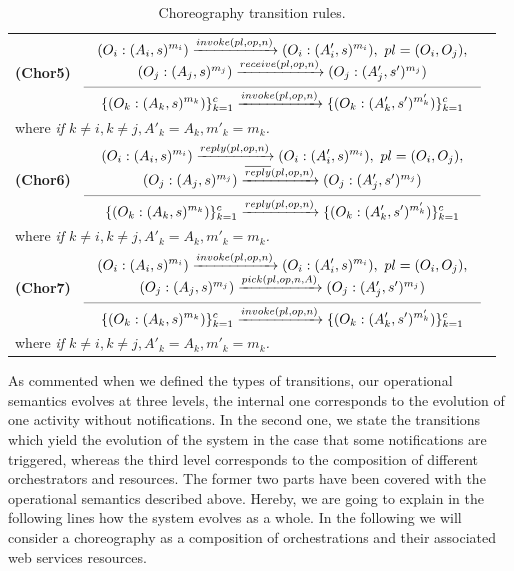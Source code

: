 \begin{table}[!ht]
{{\begin{tabular}{l}

\\[0.7cm]

\hspace{0.6cm}\textbf{(Chor5)}
$\reglaa{ %
(O_i:(A_i,s)^{m_i}) \xrightarrow{invoke(pl,op,n)} (O_i:(A'_i,s)^{m_i}),\ pl=(O_i,O_j),\\
(O_j:(A_j,s)^{m_j}) \xrightarrow{receive(pl,op,n)} (O_j:(A'_j,s')^{m_j})
}
{ %
\{(O_k:(A_k,s)^{m_k})\}_{k=1}^c
\xrightarrow{invoke(pl,op,n)}
\{(O_k:(A'_k,s')^{m'_k})\}_{k=1}^c
}{10}$
\\[0.7cm]
\hspace{2.cm}where  \it{if} $k\neq i,k\neq j, A'_k=A_k,m'_k=m_k$.

\\[0.2cm]

\hspace{0.6cm}\textbf{(Chor6)}
$\reglaa{ %
(O_i:(A_i,s)^{m_i}) \xrightarrow{reply(pl,op,n)} (O_i:(A'_i,s)^{m_i}),\ pl=(O_i,O_j),\\
(O_j:(A_j,s)^{m_j}) \xrightarrow{\overline{reply}(pl,op,n)} (O_j:(A'_j,s')^{m_j})
}
{ %
\{(O_k:(A_k,s)^{m_k})\}_{k=1}^c
\xrightarrow{reply(pl,op,n)}
\{(O_k:(A'_k,s')^{m'_k})\}_{k=1}^c
}{10}$\\[0.7cm]
\hspace{2.cm}where  \it{if} $k\neq i,k\neq j, A'_k=A_k,m'_k=m_k$.

\\[0.2cm]

\hspace{0.6cm}\textbf{(Chor7)}
$\reglaa{ %
(O_i:(A_i,s)^{m_i}) \xrightarrow{invoke(pl,op,n)} (O_i:(A'_i,s)^{m_i}),\ pl=(O_i,O_j),\\
(O_j:(A_j,s)^{m_j}) \xrightarrow{pick(pl,op,n,A)} (O_j:(A'_j,s')^{m_j})
}
{ %
\{(O_k:(A_k,s)^{m_k})\}_{k=1}^c
\xrightarrow{invoke(pl,op,n)}
\{(O_k:(A'_k,s')^{m'_k})\}_{k=1}^c
}{10}$\\[0.7cm]
\hspace{2.cm}where  \it{if} $k\neq i,k\neq j, A'_k=A_k,m'_k=m_k$.
\\[0.4cm]
\end{tabular}
}}
\caption{\label{tab:coreo}Choreography transition rules.}
\end{table}
As commented when we defined the types of transitions, our operational semantics evolves at three levels, the internal one corresponds to the evolution of one activity without notifications. In the second one, we state the transitions which yield the evolution of the system in the case that some notifications are triggered, whereas the third level corresponds to the composition of different orchestrators and resources. The former two parts have been covered with the operational semantics described above. Hereby, we are going to explain in the following lines how the system evolves as a whole. In the following we will consider a choreography as a composition of orchestrations and their associated web services resources.
